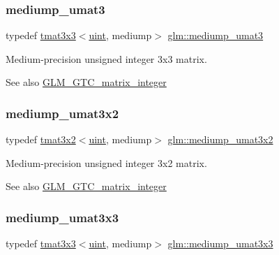 \subsubsection{\texorpdfstring{mediump\+\_\+umat3}{mediump\_umat3}}
{\footnotesize\ttfamily typedef \hyperlink{structglm_1_1tmat3x3}{tmat3x3}$<$\hyperlink{group__core__precision_ga4fd29415871152bfb5abd588334147c8}{uint}, mediump$>$ \hyperlink{group__gtc__matrix__integer_ga953d4cb3e70d85567756b3fbcca0e9e9}{glm\+::mediump\+\_\+umat3}}

Medium-\/precision unsigned integer 3x3 matrix. \begin{DoxySeeAlso}{See also}
\hyperlink{group__gtc__matrix__integer}{G\+L\+M\+\_\+\+G\+T\+C\+\_\+matrix\+\_\+integer} 
\end{DoxySeeAlso}
\mbox{\label{group__gtc__matrix__integer_ga62243caa5b85b1cf91021ce6ffc21183}} 
\subsubsection{\texorpdfstring{mediump\+\_\+umat3x2}{mediump\_umat3x2}}
{\footnotesize\ttfamily typedef \hyperlink{structglm_1_1tmat3x2}{tmat3x2}$<$\hyperlink{group__core__precision_ga4fd29415871152bfb5abd588334147c8}{uint}, mediump$>$ \hyperlink{group__gtc__matrix__integer_ga62243caa5b85b1cf91021ce6ffc21183}{glm\+::mediump\+\_\+umat3x2}}

Medium-\/precision unsigned integer 3x2 matrix. \begin{DoxySeeAlso}{See also}
\hyperlink{group__gtc__matrix__integer}{G\+L\+M\+\_\+\+G\+T\+C\+\_\+matrix\+\_\+integer} 
\end{DoxySeeAlso}
\mbox{\label{group__gtc__matrix__integer_gaa55f7815a399a780907a1dcd4caef7d9}} 
\subsubsection{\texorpdfstring{mediump\+\_\+umat3x3}{mediump\_umat3x3}}
{\footnotesize\ttfamily typedef \hyperlink{structglm_1_1tmat3x3}{tmat3x3}$<$\hyperlink{group__core__precision_ga4fd29415871152bfb5abd588334147c8}{uint}, mediump$>$ \hyperlink{group__gtc__matrix__integer_gaa55f7815a399a780907a1dcd4caef7d9}{glm\+::mediump\+\_\+umat3x3}}

